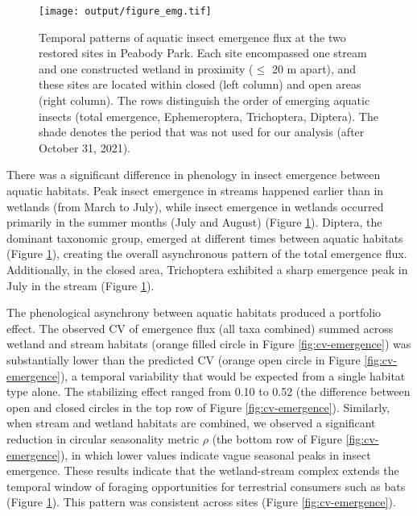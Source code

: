 \documentclass[11pt, class=article, crop=false]{standalone}
\begin{document}
\begin{figure}
    \centering
    \texttt{[image: output/figure\_emg.tif]}
    \caption{Temporal patterns of aquatic insect emergence flux at the two restored sites in Peabody Park. Each site encompassed one stream and one constructed wetland in proximity ($\le$ 20 m apart), and these sites are located within closed (left column) and open areas (right column).
    The rows distinguish the order of emerging aquatic insects (total emergence, Ephemeroptera, Trichoptera, Diptera).
    The shade denotes the period that was not used for our analysis (after October 31, 2021).}
    \label{fig:insect-phenology}
\end{figure}

There was a significant difference in phenology in insect emergence between aquatic habitats.
Peak insect emergence in streams happened earlier than in wetlands (from March to July), while insect emergence in wetlands occurred primarily in the summer months (July and August) (Figure \ref{fig:insect-phenology}).
Diptera, the dominant taxonomic group, emerged at different times between aquatic habitats (Figure \ref{fig:insect-phenology}), creating the overall asynchronous pattern of the total emergence flux.
Additionally, in the closed area, Trichoptera exhibited a sharp emergence peak in July in the stream (Figure \ref{fig:insect-phenology}).



The phenological asynchrony between aquatic habitats produced a portfolio effect.
The observed CV of emergence flux (all taxa combined) summed across wetland and stream habitats (orange filled circle in Figure \ref{fig:cv-emergence}) was substantially lower than the predicted CV (orange open circle in Figure \ref{fig:cv-emergence}), a temporal variability that would be expected from a single habitat type alone.
The stabilizing effect ranged from 0.10 to 0.52 (the difference between open and closed circles in the top row of Figure \ref{fig:cv-emergence}).
Similarly, when stream and wetland habitats are combined, we observed a significant reduction in circular seasonality metric $\rho$ (the bottom row of Figure \ref{fig:cv-emergence}), in which lower values indicate vague seasonal peaks in insect emergence.
These results indicate that the wetland-stream complex extends the temporal window of foraging opportunities for terrestrial consumers such as bats (Figure \ref{fig:insect-phenology}).
This pattern was consistent across sites (Figure \ref{fig:cv-emergence}).
\end{document}
